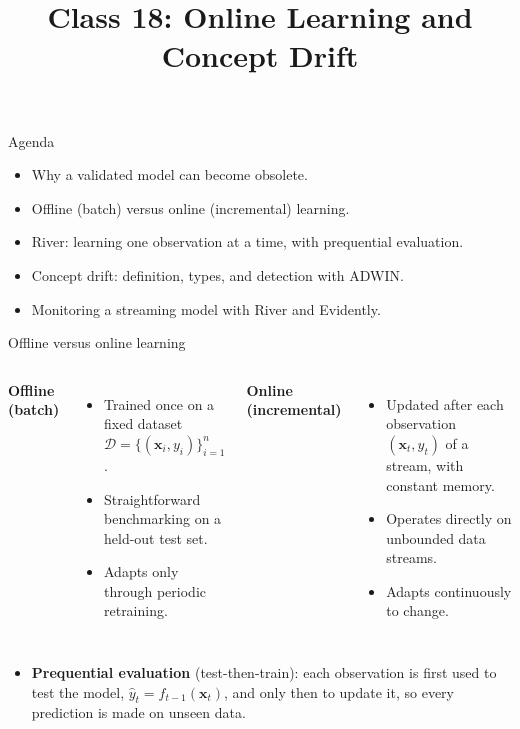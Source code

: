 
\usepackage{amssymb}

\title{Class 18: Online Learning and Concept Drift}
\author{\coursename}
\date{}



\frame{\titlepage \coursefooter}

\begin{frame}{Agenda}
\begin{itemize}
\item Why a validated model can become obsolete.
\item Offline (batch) versus online (incremental) learning.
\item River: learning one observation at a time, with prequential evaluation.
\item Concept drift: definition, types, and detection with ADWIN.
\item Monitoring a streaming model with River and Evidently.
\end{itemize}
\coursefooter
\end{frame}

\begin{frame}{Offline versus online learning}
\begin{columns}[T]
\textbf{Offline (batch)}
\begin{itemize}
\item Trained once on a fixed dataset $\mathcal{D} = \{(\mathbf{x}_i, y_i)\}_{i=1}^{n}$.
\item Straightforward benchmarking on a held-out test set.
\item Adapts only through periodic retraining.
\end{itemize}
\textbf{Online (incremental)}
\begin{itemize}
\item Updated after each observation $(\mathbf{x}_t, y_t)$ of a stream, with constant memory.
\item Operates directly on unbounded data streams.
\item Adapts continuously to change.
\end{itemize}
\end{columns}
\vspace{0.6em}
\begin{itemize}
\item \textbf{Prequential evaluation} (test-then-train): each observation is first used to test the model, $\hat{y}_t = f_{t-1}(\mathbf{x}_t)$, and only then to update it, so every prediction is made on unseen data.
\end{itemize}
\coursefooter
\end{frame}

